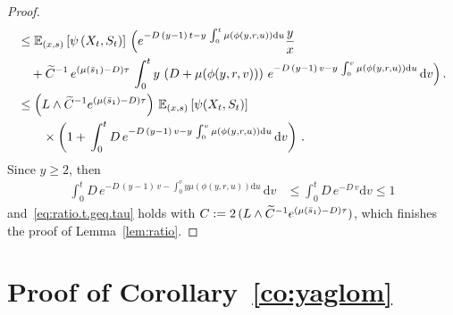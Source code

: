\documentclass[10pt]{amsart}
\theoremstyle{definition}\newtheorem{defi}[theo]{Definition}\newtheorem{rema}[theo]{Remark}\newtheorem{exam}[theo]{Example}\newtheorem{exem}[theo]{Example}\newtheorem{nota}[theo]{Notation}
\newcommand{\EE}{\mathbb{E}}
\newcommand{\dif}{\mathrm{d}}
\newcommand{\barmu}{\mu(\bar s_1)}
\newcommand{\1}{\mathbf{1}}
\let\oldtilde\tilde
\renewcommand*{\tilde}[1]{\mathchoice{\widetilde{#1}}{\widetilde{#1}}{\oldtilde{#1}}{\oldtilde{#1}}}
\begin{document}
\begin{proof}
\begin{multline*}
\begin{aligned}
&\leq \EE_{(x,s)} \left[\psi \left(X_{t}, S_{t}\right)\right]\,\Big(e^{-D\,(y-1)\, t - y\,\int_0^t \mu (\phi(y,r,u)) \dif u} \frac{y}{x}\\
&\quad + \tilde C^{-1}\,e^{(\barmu-D) \tau} \,\int_0^t y\,\left(D+\mu (\phi(y,r,v))\right)\, e^{-D\,(y-1)\, v -y \,\int_0^v \mu \left(\phi(y,r,u)\right) \dif u}\, \dif v\Big)\,.
\\
&\leq \left(L\wedge \tilde C^{-1}e^{(\barmu-D) \tau}\right)\,\EE_{(x,s)} \left[\psi (X_{t}, S_{t})\right]
\\ & \qquad \times \left(1+ \,\int_0^t D\, e^{-D\,(y-1)\, v -y \,\int_0^v \mu (\phi(y,r,u)) \dif u}\, \dif v\right)\,.
\end{aligned}
\end{multline*}
Since $y\geq 2$, then
\begin{align*}
\int_0^t D\, e^{-D\,(y-1)\, v - \int_0^v y \mu (\phi(y,r,u)) \dif u}\, \dif v & \leq \int_0^t D\, e^{-D\, v} \dif v \leq 1
\end{align*}
and~\eqref{eq:ratio.t.geq.tau} holds with $C:=2\,(L\wedge \tilde C^{-1}e^{(\barmu-D) \tau})$, which finishes the proof of Lemma~\ref{lem:ratio}.
\end{proof}



\section{Proof of Corollary~\ref{co:yaglom}}\label{sec:proof.corollary}
\end{document}
